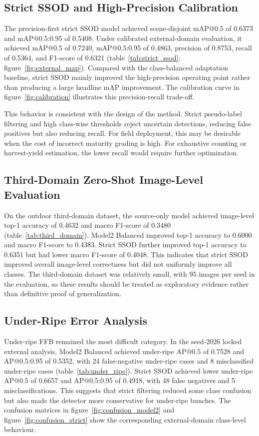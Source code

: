 ﻿\documentclass[12pt]{article}
\begin{document}
\subsection{Strict SSOD and High-Precision Calibration}

The precision-first strict SSOD model achieved scene-disjoint mAP@0.5 of 0.6373 and mAP@0.5:0.95 of 0.5408. Under calibrated external-domain evaluation, it achieved mAP@0.5 of 0.7240, mAP@0.5:0.95 of 0.4863, precision of 0.8753, recall of 0.5364, and F1-score of 0.6321 (table~\ref{tab:strict_ssod}; figure~\ref{fig:external_map}). Compared with the class-balanced adaptation baseline, strict SSOD mainly improved the high-precision operating point rather than producing a large headline mAP improvement. The calibration curve in figure~\ref{fig:calibration} illustrates this precision-recall trade-off.

This behavior is consistent with the design of the method. Strict pseudo-label filtering and high class-wise thresholds reject uncertain detections, reducing false positives but also reducing recall. For field deployment, this may be desirable when the cost of incorrect maturity grading is high. For exhaustive counting or harvest-yield estimation, the lower recall would require further optimization.

\subsection{Third-Domain Zero-Shot Image-Level Evaluation}

On the outdoor third-domain dataset, the source-only model achieved image-level top-1 accuracy of 0.4632 and macro F1-score of 0.3480 (table~\ref{tab:third_domain}). Model2 Balanced improved top-1 accuracy to 0.6000 and macro F1-score to 0.4383. Strict SSOD further improved top-1 accuracy to 0.6351 but had lower macro F1-score of 0.4048. This indicates that strict SSOD improved overall image-level correctness but did not uniformly improve all classes. The third-domain dataset was relatively small, with 95 images per seed in the evaluation, so these results should be treated as exploratory evidence rather than definitive proof of generalization.

\subsection{Under-Ripe Error Analysis}

Under-ripe FFB remained the most difficult category. In the seed-2026 locked external analysis, Model2 Balanced achieved under-ripe AP@0.5 of 0.7528 and AP@0.5:0.95 of 0.5352, with 24 false-negative under-ripe cases and 8 misclassified under-ripe cases (table~\ref{tab:under_ripe}). Strict SSOD achieved lower under-ripe AP@0.5 of 0.6657 and AP@0.5:0.95 of 0.4918, with 48 false negatives and 5 misclassifications. This suggests that strict filtering reduced some class confusion but also made the detector more conservative for under-ripe bunches. The confusion matrices in figure~\ref{fig:confusion_model2} and figure~\ref{fig:confusion_strict} show the corresponding external-domain class-level behaviour.
\end{document}
